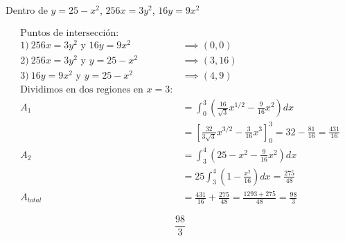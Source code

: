 Dentro de $y=25-x^2$, $256x=3y^2$, $16y=9x^2$

\nopagebreak
\begin{align*}
\text{Puntos de intersección:} \\
1) \ 256x=3y^2 \text{ y } 16y=9x^2 & \implies (0,0) \\
2) \ 256x=3y^2 \text{ y } y=25-x^2 & \implies (3,16) \\
3) \ 16y=9x^2 \text{ y } y=25-x^2 & \implies (4,9) \\
\text{Dividimos en dos regiones en } x=3: \\
A_1 &= \int_{0}^{3} \left( \frac{16}{\sqrt{3}}x^{1/2} - \frac{9}{16}x^2 \right) dx \\
&= \left[ \frac{32}{3\sqrt{3}}x^{3/2} - \frac{3}{16}x^3 \right]_0^3 = 32 - \frac{81}{16} = \frac{431}{16} \\
A_2 &= \int_{3}^{4} \left( 25-x^2 - \frac{9}{16}x^2 \right) dx \\
&= 25 \int_{3}^{4} \left( 1 - \frac{x^2}{16} \right) dx = \frac{275}{48} \\
A_{total} &= \frac{431}{16} + \frac{275}{48} = \frac{1293+275}{48} = \frac{98}{3}
\end{align*}

\[
\boxed{\displaystyle \frac{98}{3}}
\]
